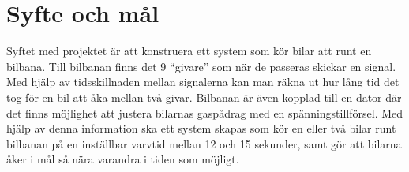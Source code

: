 \section{Syfte och mål}

Syftet med projektet är att konstruera ett system som kör bilar att runt en
bilbana. Till bilbanan finns det 9 ``givare'' som när de passeras skickar en
signal. Med hjälp av tidsskillnaden mellan signalerna kan man räkna ut hur lång
tid det tog för en bil att åka mellan två givar. Bilbanan är även kopplad till
en dator där det finns möjlighet att justera bilarnas gaspådrag med en
spänningstillförsel. Med hjälp av denna information ska ett system skapas som
kör en eller två bilar runt bilbanan på en inställbar varvtid mellan 12 och 15
sekunder, samt gör att bilarna åker i mål så nära varandra i tiden som möjligt.
